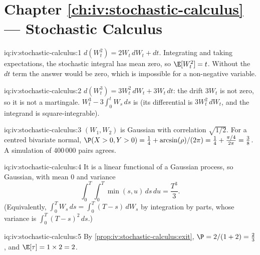 \section*{Chapter \ref{ch:iv:stochastic-calculus} --- Stochastic Calculus}

\begin{solution}{iq:iv:stochastic-calculus:1}
$d(W_t^2) = 2W_t\,dW_t + dt$. Integrating and taking expectations, the stochastic integral has mean zero, so $\E[W_t^2]
= t$. Without the $dt$ term the answer would be zero, which is impossible for a non-negative variable.
\end{solution}

\begin{solution}{iq:iv:stochastic-calculus:2}
$d(W_t^3) = 3W_t^2\,dW_t + 3W_t\,dt$: the drift $3W_t$ is not zero, so it is not a martingale. $W_t^3 - 3\int_0^t
W_s\,ds$ is (its differential is $3W_t^2\,dW_t$, and the integrand is square-integrable).
\end{solution}

\begin{solution}{iq:iv:stochastic-calculus:3}
$(W_1, W_2)$ is Gaussian with correlation $\sqrt{1/2}$. For a centred bivariate normal, $\P(X > 0, Y > 0) = \tfrac14 +
\arcsin(\rho)/(2\pi) = \tfrac14 + \tfrac{\pi/4}{2\pi} = \tfrac38$. A simulation of 400\,000 pairs agrees.
\end{solution}

\begin{solution}{iq:iv:stochastic-calculus:4}
It is a linear functional of a Gaussian process, so Gaussian, with mean 0 and variance
\[
\int_0^T\!\!\int_0^T \min(s,u)\,ds\,du = \frac{T^3}{3}.
\] (Equivalently, $\int_0^T W_s\,ds = \int_0^T (T - s)\,dW_s$ by integration by parts, whose variance is $\int_0^T
(T - s)^2\,ds$.)
\end{solution}

\begin{solution}{iq:iv:stochastic-calculus:5}
By \cref{prop:iv:stochastic-calculus:exit}, $\P = 2/(1 + 2) = \tfrac23$, and $\E[\tau] = 1 \times 2 = 2$.
\end{solution}

